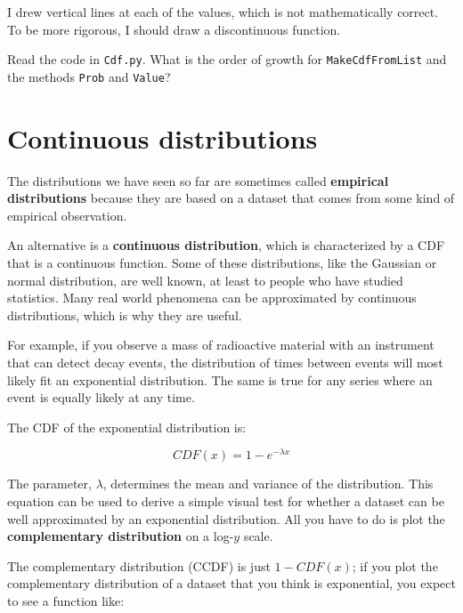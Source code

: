 \documentclass[10pt]{book}
\begin{document}
I drew vertical lines at each of the values, which is not
mathematically correct.  To be more rigorous, I should draw
a discontinuous function.

\begin{ex}

Read the code in {\tt Cdf.py}.  What is the order of growth for
{\tt MakeCdfFromList} and the methods {\tt Prob} and {\tt Value}?

\end{ex}


\section{Continuous distributions}

The distributions we have seen so far are sometimes called
{\bf empirical distributions} because they are based on a
dataset that comes from some kind of empirical observation.

An alternative is a {\bf continuous distribution},
which is characterized by a CDF that is a continuous function.
Some of these distributions, like the
Gaussian or normal
distribution, are well known, at least to people who have studied
statistics.  Many real world phenomena can be approximated by
continuous distributions, which is why they are useful.

For example, if you observe a mass of radioactive material with
an instrument that can detect decay events, the distribution
of times between events will most likely fit an exponential
distribution.  The same is true for any series where
an event is equally likely at any time.

The CDF of the exponential distribution is:

\[ CDF(x) = 1 - e^{-\lambda x} \]

The parameter, $\lambda$, determines the mean and variance
of the distribution.  This equation can be used to derive
a simple visual test for whether a dataset can be well
approximated by an exponential distribution.  All you
have to do is plot the {\bf complementary distribution}
on a log-$y$ scale.

The complementary distribution (CCDF) is just $1 - CDF(x)$; 
if you plot the complementary distribution of a dataset
that you think is exponential, you expect to see a function
like:
\end{document}
